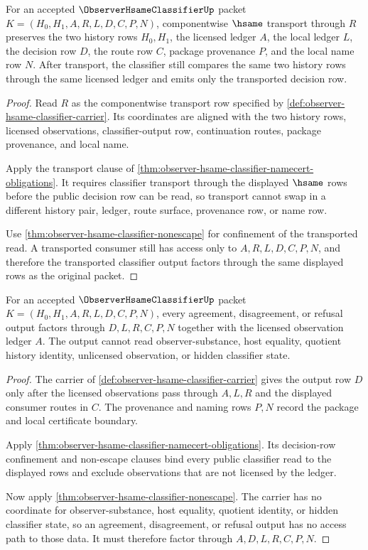 \begin{theorem}
\label{thm:observer-hsame-classifier-transport-stability}
For an accepted $\ObserverHsameClassifierUp$ packet $K=(H_0,H_1,A,R,L,D,C,P,N)$, componentwise $\hsame$ transport through $R$ preserves the two history rows $H_0,H_1$, the licensed ledger $A$, the local ledger $L$, the decision row $D$, the route row $C$, package provenance $P$, and the local name row $N$. After transport, the classifier still compares the same two history rows through the same licensed ledger and emits only the transported decision row.
\end{theorem}
\begin{proof}
Read $R$ as the componentwise transport row specified by \autoref{def:observer-hsame-classifier-carrier}. Its coordinates are aligned with the two history rows, licensed observations, classifier-output row, continuation routes, package provenance, and local name.

Apply the transport clause of \autoref{thm:observer-hsame-classifier-namecert-obligations}. It requires classifier transport through the displayed $\hsame$ rows before the public decision row can be read, so transport cannot swap in a different history pair, ledger, route surface, provenance row, or name row.

Use \autoref{thm:observer-hsame-classifier-nonescape} for confinement of the transported read. A transported consumer still has access only to $A,R,L,D,C,P,N$, and therefore the transported classifier output factors through the same displayed rows as the original packet.
\end{proof}

\begin{theorem}
\label{thm:observer-hsame-classifier-output-confinement}
For an accepted $\ObserverHsameClassifierUp$ packet $K=(H_0,H_1,A,R,L,D,C,P,N)$, every agreement, disagreement, or refusal output factors through $D,L,R,C,P,N$ together with the licensed observation ledger $A$. The output cannot read observer-substance, host equality, quotient history identity, unlicensed observation, or hidden classifier state.
\end{theorem}
\begin{proof}
The carrier of \autoref{def:observer-hsame-classifier-carrier} gives the output row $D$ only after the licensed observations pass through $A,L,R$ and the displayed consumer routes in $C$. The provenance and naming rows $P,N$ record the package and local certificate boundary.

Apply \autoref{thm:observer-hsame-classifier-namecert-obligations}. Its decision-row confinement and non-escape clauses bind every public classifier read to the displayed rows and exclude observations that are not licensed by the ledger.

Now apply \autoref{thm:observer-hsame-classifier-nonescape}. The carrier has no coordinate for observer-substance, host equality, quotient identity, or hidden classifier state, so an agreement, disagreement, or refusal output has no access path to those data. It must therefore factor through $A,D,L,R,C,P,N$.
\end{proof}

